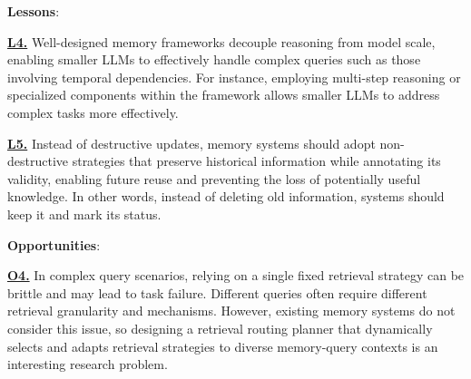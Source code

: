 \noindent \textbf{Lessons}: 

\noindent {} \textbf{\underline{L4.}}
Well-designed memory frameworks decouple reasoning from model scale, enabling smaller LLMs to effectively handle complex queries such as those involving temporal dependencies. For instance, employing multi-step reasoning or specialized components within the framework allows smaller LLMs to address complex tasks more effectively.


\noindent {} \textbf{\underline{L5.}}
Instead of destructive updates, memory systems should adopt non-destructive strategies that preserve historical information while annotating its validity, enabling future reuse and preventing the loss of potentially useful knowledge. In other words, instead of deleting old information, systems should keep it and mark its status.

\noindent \textbf{Opportunities}:

\noindent {} \textbf{\underline{O4.}}
In complex query scenarios, relying on a single fixed retrieval strategy can be brittle and may lead to task failure. Different queries often require different retrieval granularity and mechanisms. However, existing memory systems do not consider this issue, so designing a retrieval routing planner that dynamically selects and adapts retrieval strategies to diverse memory-query contexts is an interesting research problem.


